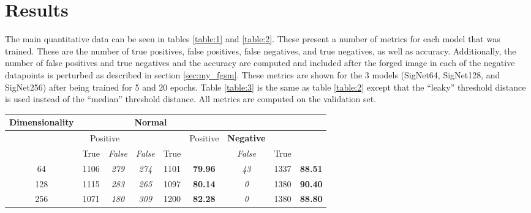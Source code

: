 \section{Results}\label{sec:results}

The main quantitative data can be seen in tables \ref{table:1} and \ref{table:2}.
These present a number of metrics for each model that was trained.
These are the number of true positives, false positives, false negatives, and true negatives, as well as accuracy.
Additionally, the number of false positives and true negatives and the accuracy are computed and included after the forged image in each of the negative datapoints is perturbed as described in section \ref{sec:my_fgsm}.
These metrics are shown for the 3 models (SigNet64, SigNet128, and SigNet256) after being trained for 5 and 20 epochs.
Table \ref{table:3} is the same as table \ref{table:2} except that the ``leaky'' threshold distance is used instead of the ``median'' threshold distance.
All metrics are computed on the validation set.

\begin{table*}[t]
    \centering
    \begin{tabular}{|c | c >{\em}c | >{\em}c c | >{\bfseries}c | >{\em}c c >{\bfseries}c|}
        \hline
        \multirow{3}{*}{Dimensionality} & \multicolumn{5}{c|}{Normal} & \multicolumn{3}{c|}{Adversarial}\\
        \hline
        & \multicolumn{2}{c|}{Positive} & \multicolumn{2}{c|}{Negative} & \multirow{2}{*}{Accuracy} & Positive & Negative & \multirow{2}{*}{Accuracy}\\
        & True & False & False & True & & False & True & \\
        \hline
        64 & 1106 & 279 & 274 & 1101 & 79.96 & 43 & 1337 & 88.51\\
        128 & 1115 & 283 & 265 & 1097 & 80.14 & 0 & 1380 & 90.40\\
        256 & 1071 & 180 & 309 & 1200 & 82.28 & 0 & 1380 & 88.80\\
        \hline
    \end{tabular}
    \caption{Comparison of Accuracy using Latent Vector Sizes after 5 Epochs}
    \label{table:1}
\end{table*}

